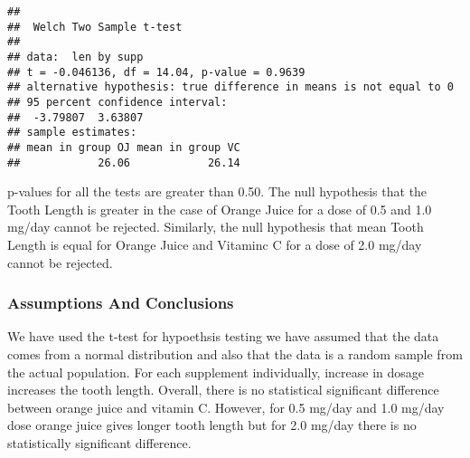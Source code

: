 \documentclass[
]{article}
\newenvironment{Shaded}{\begin{snugshade}}{\end{snugshade}}
\newcommand{\AttributeTok}[1]{\textcolor[rgb]{0.77,0.63,0.00}{#1}}
\newcommand{\CommentTok}[1]{\textcolor[rgb]{0.56,0.35,0.01}{\textit{#1}}}
\newcommand{\ConstantTok}[1]{\textcolor[rgb]{0.00,0.00,0.00}{#1}}
\newcommand{\FloatTok}[1]{\textcolor[rgb]{0.00,0.00,0.81}{#1}}
\newcommand{\FunctionTok}[1]{\textcolor[rgb]{0.00,0.00,0.00}{#1}}
\newcommand{\NormalTok}[1]{#1}
\newcommand{\OtherTok}[1]{\textcolor[rgb]{0.56,0.35,0.01}{#1}}
\newcommand{\SpecialCharTok}[1]{\textcolor[rgb]{0.00,0.00,0.00}{#1}}
\begin{document}
\begin{Shaded}
\end{Shaded}

\begin{verbatim}
## 
##  Welch Two Sample t-test
## 
## data:  len by supp
## t = -0.046136, df = 14.04, p-value = 0.9639
## alternative hypothesis: true difference in means is not equal to 0
## 95 percent confidence interval:
##  -3.79807  3.63807
## sample estimates:
## mean in group OJ mean in group VC 
##            26.06            26.14
\end{verbatim}

p-values for all the tests are greater than 0.50. The null hypothesis
that the Tooth Length is greater in the case of Orange Juice for a dose
of 0.5 and 1.0 mg/day cannot be rejected. Similarly, the null hypothesis
that mean Tooth Length is equal for Orange Juice and Vitaminc C for a
dose of 2.0 mg/day cannot be rejected.

\hypertarget{assumptions-and-conclusions}{%
\subsubsection{Assumptions And
Conclusions}\label{assumptions-and-conclusions}}

We have used the t-test for hypoethsis testing we have assumed that the
data comes from a normal distribution and also that the data is a random
sample from the actual population. For each supplement individually,
increase in dosage increases the tooth length. Overall, there is no
statistical significant difference between orange juice and vitamin C.
However, for 0.5 mg/day and 1.0 mg/day dose orange juice gives longer
tooth length but for 2.0 mg/day there is no statistically significant
difference.
\end{document}
